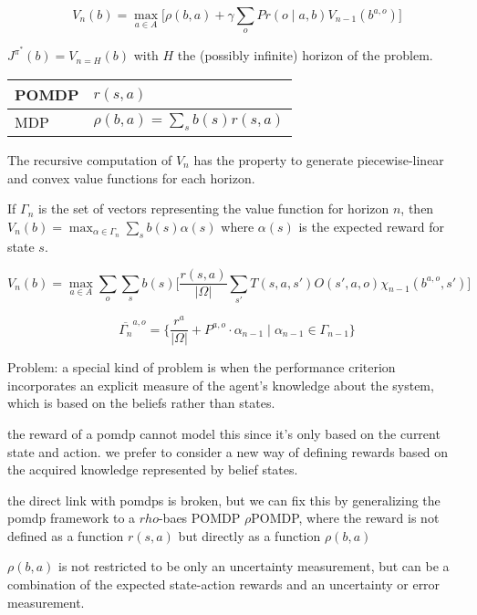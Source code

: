 \begin{equation}
	V_n(b)= \max_{a\in A} \big[\rho(b,a) + \gamma\sum_{o} Pr(o\mid a, b) V_{n-1}(b^{a,o}) \big]
\end{equation}

$J^{\pi^*}(b) = V_{n=H}(b)$ with $H$ the (possibly infinite) horizon of the problem. 


\begin{tabular}{l||l}
	POMDP & $r(s,a)$ \\
	\hline
	MDP & $\rho(b,a)=\sum_{s}b(s)r(s,a)$
\end{tabular}


The recursive computation of $V_n$ has the property to generate piecewise-linear and convex value functions for each horizon.


If $\Gamma_n$ is the set of vectors representing the value function for horizon $n$, then $V_n(b) = \max_{\alpha\in\Gamma_n}\sum_{s}b(s)\alpha(s)$ where $\alpha(s)$ is the expected reward for state $s$. 

\begin{equation}
	V_n(b) = \max_{a\in A}\sum_{o}\sum_{s}b(s)\big[\frac{r(s,a)}{|\Omega|}\sum_{s'}T(s,a,s')O(s',a,o)\chi_{n-1}(b^{a,o},s')\big]
\end{equation}

\begin{equation}
	\overline{\Gamma_n}^{a,o}=\{ \frac{r^a}{|\Omega|}+P^{a,o}\cdot\alpha_{n-1}\mid\alpha_{n-1}\in\Gamma_{n-1} \}
\end{equation}


Problem:
a special kind of problem is when the performance criterion incorporates an explicit measure of the agent's knowledge about the system, which is based on the beliefs rather than states.

the reward of a pomdp cannot model this since it's only based on the current state and action.
we prefer to consider a new way of defining rewards based on the acquired knowledge represented by belief states.

the direct link with pomdps is broken, but we can fix this by generalizing the pomdp framework to a $rho$-baes POMDP $\rho$POMDP, where the reward is not defined as a function $r(s,a)$ but directly as a function $\rho(b,a)$

$\rho(b,a)$ is not restricted to be only an uncertainty measurement, but can be a combination of the expected state-action rewards and an uncertainty or error measurement.



